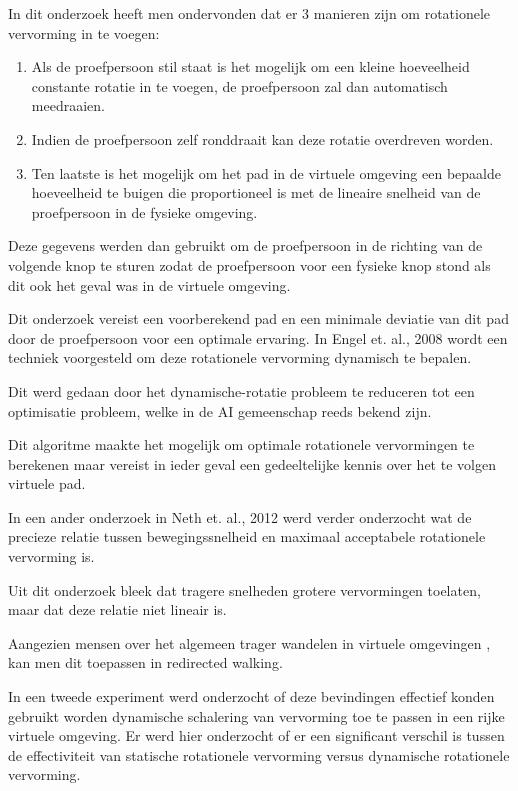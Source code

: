 In dit onderzoek heeft men ondervonden dat er 3 manieren zijn om rotationele
vervorming in te voegen:

\begin{enumerate}
    \item Als de proefpersoon stil staat is het mogelijk om een kleine 
        hoeveelheid constante rotatie in te voegen, de proefpersoon zal dan 
        automatisch meedraaien.
    \item Indien de proefpersoon zelf ronddraait kan deze rotatie overdreven 
        worden.
    \item Ten laatste is het mogelijk om het pad in de virtuele omgeving een
        bepaalde hoeveelheid te buigen die proportioneel is met de lineaire
        snelheid van de proefpersoon in de fysieke omgeving.
\end{enumerate}

Deze gegevens werden dan gebruikt om de proefpersoon in de richting van de 
volgende knop te sturen zodat de proefpersoon voor een fysieke knop stond als dit 
ook het geval was in de virtuele omgeving.

Dit onderzoek vereist een voorberekend pad en een minimale deviatie van dit pad 
door de proefpersoon voor een optimale ervaring. In Engel et. al., 2008 
\cite{engel08} wordt een techniek voorgesteld om deze rotationele vervorming 
dynamisch te bepalen.

Dit werd gedaan door het dynamische-rotatie probleem te reduceren tot een 
optimisatie probleem, welke in de AI gemeenschap reeds bekend zijn.

Dit algoritme maakte het mogelijk om optimale rotationele vervormingen te 
berekenen maar vereist in ieder geval een gedeeltelijke kennis over het te volgen
virtuele pad.

In een ander onderzoek in Neth et. al., 2012 \cite{neth12} werd verder 
onderzocht wat de precieze relatie tussen bewegingssnelheid en maximaal 
acceptabele rotationele vervorming is.

Uit dit onderzoek bleek dat tragere snelheden grotere vervormingen toelaten, maar
dat deze relatie niet lineair is.

Aangezien mensen over het algemeen trager wandelen in virtuele omgevingen
\cite{mohler07}, kan men dit toepassen in redirected walking.

In een tweede experiment \cite{neth12} werd onderzocht of deze bevindingen
effectief konden gebruikt worden dynamische schalering van vervorming toe te
passen in een rijke virtuele omgeving. Er werd hier onderzocht of er een
significant verschil is tussen de effectiviteit van statische rotationele
vervorming versus dynamische rotationele vervorming.

